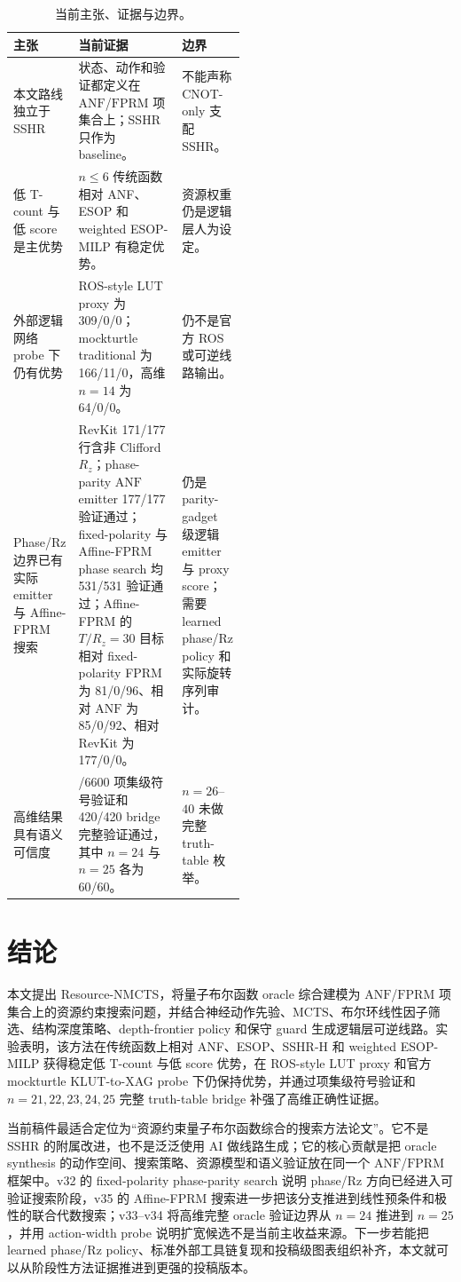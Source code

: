 \documentclass[UTF8,fontset=macnew,11pt]{ctexart}
\newcommand{\method}{Resource-NMCTS}
\newcommand{\anf}{\ensuremath{\mathrm{ANF}}}
\newcommand{\fprm}{\ensuremath{\mathrm{FPRM}}}
\newcommand{\mcts}{\ensuremath{\mathrm{MCTS}}}
\newcommand{\rz}{\ensuremath{R_z}}
\newcommand{\ttable}{truth-table}
\begin{document}
\begin{table}[H]
\centering
\small
\caption{当前主张、证据与边界。}
\label{tab:evidence-map}
\begin{tabularx}{\linewidth}{>{\raggedright\arraybackslash}p{0.27\linewidth}>{\raggedright\arraybackslash}X>{\raggedright\arraybackslash}p{0.25\linewidth}}
\toprule
主张 & 当前证据 & 边界 \\
\midrule
本文路线独立于 SSHR & 状态、动作和验证都定义在 \anf{}/\fprm{} 项集合上；SSHR 只作为 baseline。 & 不能声称 CNOT-only 支配 SSHR。 \\
低 T-count 与低 score 是主优势 & $n\leq6$ 传统函数相对 ANF、ESOP 和 weighted ESOP-MILP 有稳定优势。 & 资源权重仍是逻辑层人为设定。 \\
外部逻辑网络 probe 下仍有优势 & ROS-style LUT proxy 为 309/0/0；mockturtle traditional 为 166/11/0，高维 $n=14$ 为 64/0/0。 & 仍不是官方 ROS 或可逆线路输出。 \\
Phase/Rz 边界已有实际 emitter 与 Affine-FPRM 搜索 & RevKit 171/177 行含非 Clifford \rz{}；phase-parity \anf{} emitter 177/177 验证通过；fixed-polarity 与 Affine-FPRM phase search 均 531/531 验证通过；Affine-FPRM 的 $T/R_z=30$ 目标相对 fixed-polarity FPRM 为 81/0/96、相对 \anf{} 为 85/0/92、相对 RevKit 为 177/0/0。 & 仍是 parity-gadget 级逻辑 emitter 与 proxy score；需要 learned phase/Rz policy 和实际旋转序列审计。 \\
高维结果具有语义可信度 & 6600/6600 项集级符号验证和 420/420 bridge 完整验证通过，其中 $n=24$ 与 $n=25$ 各为 60/60。 & $n=26$--$40$ 未做完整 \ttable{} 枚举。 \\
\bottomrule
\end{tabularx}
\end{table}

\section{结论}

本文提出 \method{}，将量子布尔函数 oracle 综合建模为 \anf{}/\fprm{} 项集合上的资源约束搜索问题，并结合神经动作先验、\mcts{}、布尔环线性因子筛选、结构深度策略、depth-frontier policy 和保守 guard 生成逻辑层可逆线路。实验表明，该方法在传统函数上相对 ANF、ESOP、SSHR-H 和 weighted ESOP-MILP 获得稳定低 T-count 与低 score 优势，在 ROS-style LUT proxy 和官方 mockturtle KLUT-to-XAG probe 下仍保持优势，并通过项集级符号验证和 $n=21,22,23,24,25$ 完整 truth-table bridge 补强了高维正确性证据。

当前稿件最适合定位为“资源约束量子布尔函数综合的搜索方法论文”。它不是 SSHR 的附属改进，也不是泛泛使用 AI 做线路生成；它的核心贡献是把 oracle synthesis 的动作空间、搜索策略、资源模型和语义验证放在同一个 \anf{}/\fprm{} 框架中。v32 的 fixed-polarity phase-parity search 说明 phase/Rz 方向已经进入可验证搜索阶段，v35 的 Affine-FPRM 搜索进一步把该分支推进到线性预条件和极性的联合代数搜索；v33--v34 将高维完整 oracle 验证边界从 $n=24$ 推进到 $n=25$，并用 action-width probe 说明扩宽候选不是当前主收益来源。下一步若能把 learned phase/Rz policy、标准外部工具链复现和投稿级图表组织补齐，本文就可以从阶段性方法证据推进到更强的投稿版本。
\end{document}

